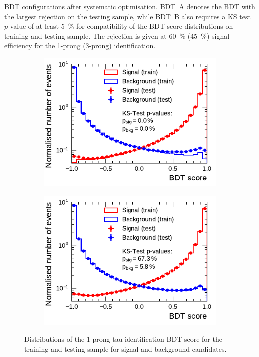 \begin{table}[htb]
  \centering
  {\small}
  \caption{BDT configurations after systematic optimisation. BDT~A denotes the
    BDT with the largest rejection on the testing sample, while BDT~B also
    requires a KS test $p$-value of at least \SI{5}{\percent} for compatibility
    of the BDT score distributions on training and testing sample. The rejection
    is given at \SI{60}{\percent} (\SI{45}{\percent}) signal efficiency for the
    1-prong (3-prong) identification.}
  \label{tab:bdt_perfs}
\end{table}

\begin{figure}[htb]
  \begin{subfigure}[t]{0.48\textwidth}
    \centering
    \includegraphics{./figures/bdt_perf/scores/grid_1p0304.pdf}
    \label{fig:bdt_score_1p}
  \end{subfigure}\hfill
  \begin{subfigure}[t]{0.48\textwidth}
    \centering
    \includegraphics{./figures/bdt_perf/scores/grid_1p_subsampling0269.pdf}
    \label{fig:bdt_score_1p_ks5}
  \end{subfigure}
  \caption{Distributions of the 1-prong tau identification BDT score for the
    training and testing sample for signal and background candidates.}
  \label{fig:bdt_overfitting_scores}
\end{figure}

